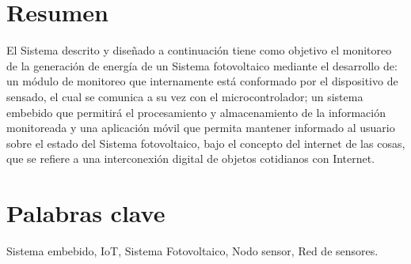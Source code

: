 \section{Resumen}
El Sistema descrito y diseñado a continuación tiene como objetivo el monitoreo de la generación de energía de un Sistema fotovoltaico mediante el desarrollo de: un módulo de monitoreo que internamente está conformado por el dispositivo de sensado, el cual se comunica a su vez con el microcontrolador; un sistema embebido que permitirá el procesamiento y almacenamiento de la información monitoreada y una aplicación móvil que permita mantener informado al usuario sobre el estado del Sistema fotovoltaico, bajo el concepto del internet de las cosas, que se refiere a una interconexión digital de objetos cotidianos con Internet.

\section{Palabras clave}
Sistema embebido, IoT, Sistema Fotovoltaico, Nodo sensor, Red de sensores.


